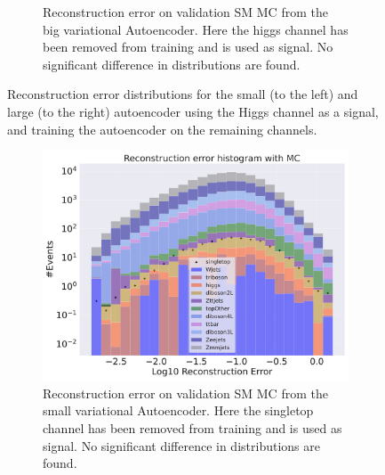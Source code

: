 \begin{figure}[h!]
\begin{subfigure}{.45\textwidth}
        \caption{Reconstruction error on validation SM MC from the big variational Autoencoder. Here the higgs channel has been removed from training and 
        is used as signal. No significant difference in distributions are found. }
        \label{fig:vae_big_higgs}
    \end{subfigure}
    \hfill  
    \caption[VAE | Reconstruction error using Higgs channel as signal]{Reconstruction error distributions for the small (to the left) and large (to the right) autoencoder using the Higgs channel as a signal, and 
    training the autoencoder on the remaining channels. }
    \label{fig:vae_big_channel_1}
\end{figure}

\begin{figure}[h!]
    \centering
    \begin{subfigure}{.45\textwidth}
        \includegraphics[width=\textwidth]{Figures/VAE_testing/small/b_data_recon_big_rm3_feats_sig_singletop.pdf}
        \caption{Reconstruction error on validation SM MC from the small variational Autoencoder. Here the singletop channel has been removed from training and 
        is used as signal. No significant difference in distributions are found. }
        \label{fig:vae_small_singletop}
    \end{subfigure}
    \hfill
    \begin{subfigure}{.45\textwidth}

\end{subfigure}
\end{figure}
